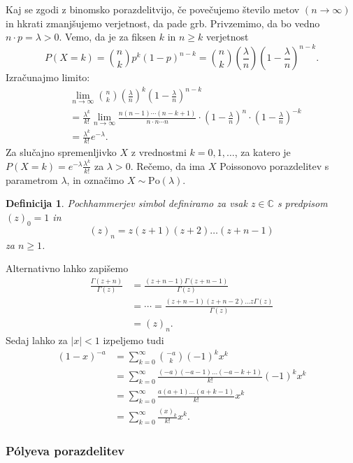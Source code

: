 \documentclass[10pt, a4paper]{article}
\newtheorem{defi}[izr]{Definicija}
\newenvironment{noticeB}{%
  \tcolorbox[%
  notitle,
  empty,
  enhanced,  %
  breakable,
  coltext=black,
  colback=white, 
  fontupper=\rmfamily,
  parbox=false,
  noparskip,
  sharp corners,
  boxrule=-1pt,  %
  frame hidden,
  left=7pt,  %
  right=7pt,
  top=5pt,
  bottom=5pt,
  before skip=2.5ex plus 2pt,
  after skip=2.5ex plus 2pt,
  borderline west = {1.5pt}{-0.1pt}{blue!30!black}, %
  overlay unbroken and last={%
    \draw[color=black, line width=1.25pt]
    ($(frame.south west)+(1.pt, -0.1pt)$) -- ++(2em, 0);
  }
  ]}
{\endtcolorbox}
\newenvironment{definicija}{\begin{defi}\begin{noticeB}}{%
    \end{noticeB}\end{defi}}
\newcommand{\C}{\mathbb {C}}
\begin{document}
Kaj se zgodi z binomsko porazdelitvijo, če povečujemo število metov $(n \to \infty)$
in hkrati zmanjšujemo verjetnost, da pade grb.
Privzemimo, da bo vedno $n \cdot p = \lambda > 0$.
Vemo, da je za fiksen $k$ in $n \geq k$ verjetnost 
$$P(X = k) = \binom{n}{k} p^k (1 - p)^{n - k} = \binom{n}{k} \left(\frac{\lambda}{n}\right) \left(1 - \frac{\lambda}{n}\right)^{n - k}.$$
Izračunajmo limito:
\begin{align*}
  &\lim_{n \to \infty} \binom{n}{k} \left(\frac{\lambda}{n}\right)^k \left(1 - \frac{\lambda}{n}\right)^{n - k}\\
  &= \frac{\lambda^k}{k!} \lim_{n \to \infty} \frac{n (n - 1) \cdots (n - k + 1)}{n \cdot n \cdots n} \cdot \left(1 - \frac{\lambda}{n}\right)^n \cdot \left(1 - \frac{\lambda}{n}\right)^{-k}\\
  &= \frac{\lambda^k}{k!} e^{-\lambda}. 
\end{align*}
Za slučajno spremenljivko $X$ z vrednostmi $k = 0, 1, \dots$,
za katero je $P(X = k) = e^{-\lambda} \frac{\lambda^k}{k!}$ za $\lambda > 0$.
Rečemo, da ima $X$ Poissonovo porazdelitev s parametrom $\lambda$, in označimo $X \sim \mathrm{Po} (\lambda)$.

\begin{definicija}
  Pochhammerjev simbol definiramo za vsak $z \in \C$ s predpisom 
  $(z)_0 = 1$ in 
  $$(z)_n = z (z + 1) (z + 2) \dots (z + n - 1)$$
  za $n \geq 1$. 
\end{definicija}

Alternativno lahko zapišemo 
\begin{align*}
  \frac{\Gamma(z + n)}{\Gamma(z)} &= \frac{(z + n - 1) \Gamma(z + n - 1)}{\Gamma(z)} \\
   &= \cdots = \frac{(z + n - 1) (z + n - 2) \dots z \Gamma(z)}{\Gamma(z)}\\
   &= (z)_n.
\end{align*}
Sedaj lahko za $|x| < 1$ izpeljemo tudi
\begin{align}
  (1 - x)^{-a} &= \sum_{k = 0} ^\infty \binom{-a}{k} (-1)^k x^k\\
  &= \sum_{k = 0} ^\infty \frac{(-a) (-a -1) \dots (-a -k + 1)}{k!} (-1)^k x^k\\
  &= \sum_{k = 0} ^\infty \frac{a (a + 1) \dots (a + k - 1)}{k!} x^k\\
  &= \sum_{k = 0} ^\infty \frac{(x)_k}{k!} x^k \label{eq:1}.
\end{align}

\subsubsection*{Pólyeva porazdelitev}
\end{document}
